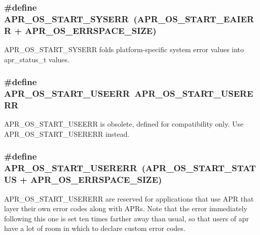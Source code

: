 \subsubsection[{\texorpdfstring{A\+P\+R\+\_\+\+O\+S\+\_\+\+S\+T\+A\+R\+T\+\_\+\+S\+Y\+S\+E\+RR}{APR_OS_START_SYSERR}}]{\setlength{\rightskip}{0pt plus 5cm}\#define A\+P\+R\+\_\+\+O\+S\+\_\+\+S\+T\+A\+R\+T\+\_\+\+S\+Y\+S\+E\+RR~({\bf A\+P\+R\+\_\+\+O\+S\+\_\+\+S\+T\+A\+R\+T\+\_\+\+E\+A\+I\+E\+RR} + {\bf A\+P\+R\+\_\+\+O\+S\+\_\+\+E\+R\+R\+S\+P\+A\+C\+E\+\_\+\+S\+I\+ZE})}\hypertarget{group__apr__errno_gad70a5cad6862a9abcc254d35e827ac8b}{}\label{group__apr__errno_gad70a5cad6862a9abcc254d35e827ac8b}
A\+P\+R\+\_\+\+O\+S\+\_\+\+S\+T\+A\+R\+T\+\_\+\+S\+Y\+S\+E\+RR folds platform-\/specific system error values into apr\+\_\+status\+\_\+t values. 
\subsubsection[{\texorpdfstring{A\+P\+R\+\_\+\+O\+S\+\_\+\+S\+T\+A\+R\+T\+\_\+\+U\+S\+E\+E\+RR}{APR_OS_START_USEERR}}]{\setlength{\rightskip}{0pt plus 5cm}\#define A\+P\+R\+\_\+\+O\+S\+\_\+\+S\+T\+A\+R\+T\+\_\+\+U\+S\+E\+E\+RR~{\bf A\+P\+R\+\_\+\+O\+S\+\_\+\+S\+T\+A\+R\+T\+\_\+\+U\+S\+E\+R\+E\+RR}}\hypertarget{group__apr__errno_ga803b8badf8695bdfa4fbcf4d330371f0}{}\label{group__apr__errno_ga803b8badf8695bdfa4fbcf4d330371f0}
A\+P\+R\+\_\+\+O\+S\+\_\+\+S\+T\+A\+R\+T\+\_\+\+U\+S\+E\+E\+RR is obsolete, defined for compatibility only. Use A\+P\+R\+\_\+\+O\+S\+\_\+\+S\+T\+A\+R\+T\+\_\+\+U\+S\+E\+R\+E\+RR instead. 
\subsubsection[{\texorpdfstring{A\+P\+R\+\_\+\+O\+S\+\_\+\+S\+T\+A\+R\+T\+\_\+\+U\+S\+E\+R\+E\+RR}{APR_OS_START_USERERR}}]{\setlength{\rightskip}{0pt plus 5cm}\#define A\+P\+R\+\_\+\+O\+S\+\_\+\+S\+T\+A\+R\+T\+\_\+\+U\+S\+E\+R\+E\+RR~({\bf A\+P\+R\+\_\+\+O\+S\+\_\+\+S\+T\+A\+R\+T\+\_\+\+S\+T\+A\+T\+US} + {\bf A\+P\+R\+\_\+\+O\+S\+\_\+\+E\+R\+R\+S\+P\+A\+C\+E\+\_\+\+S\+I\+ZE})}\hypertarget{group__apr__errno_gacd35b2de1e38a1fa4717e38d5e153571}{}\label{group__apr__errno_gacd35b2de1e38a1fa4717e38d5e153571}
A\+P\+R\+\_\+\+O\+S\+\_\+\+S\+T\+A\+R\+T\+\_\+\+U\+S\+E\+R\+E\+RR are reserved for applications that use A\+PR that layer their own error codes along with A\+PR\textquotesingle{}s. Note that the error immediately following this one is set ten times farther away than usual, so that users of apr have a lot of room in which to declare custom error codes.

